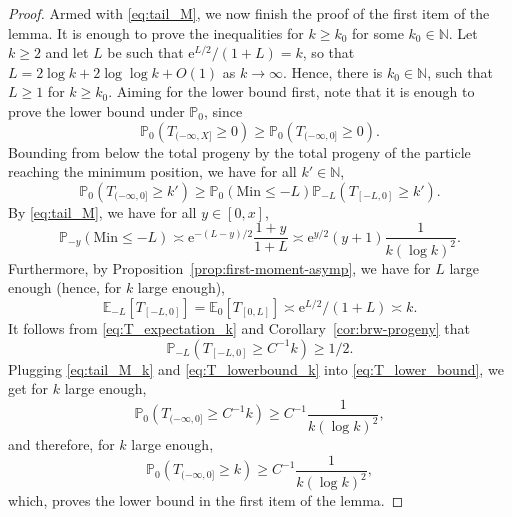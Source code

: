 \documentclass[a4paper, a4wide, 10pt, reqno]{amsart}
\theoremstyle{plain}
\theoremstyle{definition}
\numberwithin{equation}{section}
\newcommand{\N}{{\mathbb N}}
\newcommand{\E}{\mathbb E}
\newcommand{\Prob}{\mathbb{P}}
\newcommand{\re}{{\mathrm e}}
\begin{document}
\begin{proof}
	Armed with \eqref{eq:tail_M}, we now finish the proof of the first item of the lemma. It is enough to prove the inequalities for $k\ge k_0$ for some $k_0\in\N$. Let $k\ge 2$ and let $L$ be such that $\re^{L/2}/(1+L) = k$, so that $L = 2\log k + 2\log\log k+ O(1)$ as $k\to\infty$. Hence, there is $k_0\in \N$, such that $L \ge 1$ for $k\ge k_0$. Aiming for the lower bound first, note that it is enough to prove the lower bound under $\Prob_0$, since 
	\[
	 \Prob_0(T_{(-\infty,X]}\ge 0) \ge \Prob_0(T_{(-\infty,0]}\ge 0).
	\]
	Bounding from below the total progeny by the total progeny of the particle reaching the minimum position, we have for all $k'\in\N$,
	\begin{equation}
		\label{eq:T_lower_bound}
		\Prob_{0}(T_{(-\infty,0]} \ge k') \ge \Prob_{0}(\mathrm{Min} \le -L) \Prob_{-L}(T_{[-L,0]} \ge k').
	\end{equation}
	By \eqref{eq:tail_M}, we have for all $y\in[0,x]$,
	\begin{equation}
		\label{eq:tail_M_k}
	 \Prob_{-y}(\mathrm{Min} \le -L) \asymp \re^{-(L-y)/2}\frac{1+y}{1+L} \asymp \re^{y/2}(y+1) \frac {1} {k(\log k)^2}.
	 \end{equation}
	 Furthermore, by Proposition~\ref{prop:first-moment-asymp}, we have for $L$ large enough (hence, for $k$ large enough),
	 \begin{equation}
	 	\label{eq:T_expectation_k}
	 \E_{-L}[T_{[-L,0]}] = \E_0[T_{[0,L]}] \asymp \re^{L/2}/(1+L) \asymp k.
	 \end{equation}
	 It follows from \eqref{eq:T_expectation_k} and Corollary~\ref{cor:brw-progeny} that
	 \begin{equation}
	 	\label{eq:T_lowerbound_k}
	 \Prob_{-L}(T_{[-L,0]} \ge C^{-1} k) \ge 1/2.
	 \end{equation}
	 Plugging \eqref{eq:tail_M_k} and \eqref{eq:T_lowerbound_k} into \eqref{eq:T_lower_bound}, we get for $k$ large enough,
	 \[
	 \Prob_{0}(T_{(-\infty,0]} \ge C^{-1} k) \ge C^{-1} \frac{1}{k(\log k)^2},
	 \]
	 and therefore, for $k$ large enough,
	 \[
	 	 \Prob_{0}(T_{(-\infty,0]} \ge k) \ge C^{-1} \frac{1}{k(\log k)^2},
	 	 \]
	 which, proves the lower bound in the first item of the lemma.\smallskip
	 

\end{proof}
\end{document}
